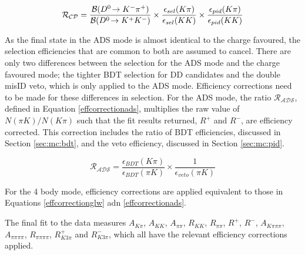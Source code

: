 \begin{equation}
\mathcal{R_{CP}} = \frac{{\mathcal{B}}({{D}^0}\!\rightarrow {\ensuremath{{K}^-}}{\ensuremath{{\pi}^+}})}{{\mathcal{B}}({{D}^0}\!\rightarrow {\ensuremath{{K}^+}}{\ensuremath{{K}^-}})} \times \frac{\epsilon_{sel}(K\pi)}{\epsilon_{sel}(KK)} \times \frac{\epsilon_{pid}(K\pi)}{\epsilon_{pid}(KK)}
\label{effcorrectionglw}
\end{equation}

As the final state in the ADS mode is almost identical to the charge favoured, the selection efficiencies that are common to both are assumed to cancel. There are only two differences between the selection for the ADS mode and the charge favoured mode; the tighter BDT selection for DD candidates and the double misID veto, which is only applied to the ADS mode. Efficiency corrections need to be made for these differences in selection. For the ADS mode, the ratio $\mathcal{R_{ADS}}$, defined in Equation \ref{effcorrectionads}, multiplies the raw value of $N(\pi K)/N(K\pi)$ such that the fit results returned, $R^+$ and $R^-$, are efficiency corrected. This correction includes the ratio of BDT efficiencies, discussed in Section \ref{sec:mc:bdt}, and the veto efficiency, discussed in Section \ref{sec:mc:pid}.

\begin{equation}
\mathcal{R_{ADS}} = \frac{\epsilon_{BDT}(K\pi)}{\epsilon_{BDT}(\pi K)} \times \frac{1}{\epsilon_{veto}(\pi K)}
\label{effcorrectionads}
\end{equation}

For the 4 body mode, efficiency corrections are applied equivalent to those in Equations \ref{effcorrectionglw} adn \ref{effcorrectionads}.

The final fit to the data measures $A_{K\pi}$, $A_{KK}$, $A_{\pi\pi}$, $R_{KK}$, $R_{\pi\pi}$, $R^+$,  $R^-$, $A_{K\pi\pi\pi}$, $A_{\pi\pi\pi\pi}$, $R_{\pi\pi\pi\pi}$, $R^+_{K3\pi}$ and  $R^-_{K3\pi}$, which all have the relevant efficiency corrections applied.

